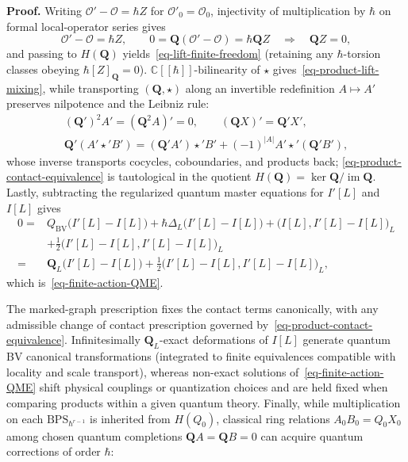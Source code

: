 \documentclass[11pt]{article}
\numberwithin{equation}{section}
\numberwithin{figure}{section}
\numberwithin{table}{section}
\begin{document}
\begin{proofbox}
\textbf{Proof.} Writing $\mathcal O'-\mathcal O=\hbar Z$ for $\mathcal O'_0=\mathcal O_0$, injectivity of multiplication by $\hbar$ on formal local-operator series gives
\begin{equation}\label{eq-mixing-closed}
\mathcal O'-\mathcal O=\hbar Z,\qquad
0=\mathbf Q(\mathcal O'-\mathcal O)=\hbar\mathbf QZ
\quad\Longrightarrow\quad \mathbf QZ=0,
\end{equation}
and passing to $H(\mathbf Q)$ yields~\eqref{eq-lift-finite-freedom} (retaining any $\hbar$-torsion classes obeying $\hbar[Z]_{\mathbf Q}=0$). $\mathbb C[[\hbar]]$-bilinearity of $\star$ gives~\eqref{eq-product-lift-mixing}, while transporting $(\mathbf Q,\star)$ along an invertible redefinition $A\mapsto A'$ preserves nilpotence and the Leibniz rule:
\begin{equation}\label{ch9-redefinition-proof}
\begin{gathered}
(\mathbf Q')^2A'=(\mathbf Q^2A)'=0,\qquad
(\mathbf QX)'=\mathbf Q'X',\\
\mathbf Q'(A'\star' B')
=(\mathbf Q'A')\star' B'+(-1)^{|A|}A'\star'(\mathbf Q'B'),
\end{gathered}
\end{equation}
whose inverse transports cocycles, coboundaries, and products back; \eqref{eq-product-contact-equivalence} is tautological in the quotient $H(\mathbf Q)=\ker\mathbf Q/\operatorname{im}\mathbf Q$. Lastly, subtracting the regularized quantum master equations for $I'[L]$ and $I[L]$ gives
\begin{equation}\label{ch9-action-proof}
\begin{aligned}
0={}&Q_{\mathrm{BV}}\bigl(I'[L]-I[L]\bigr)
+\hbar\Delta_L\bigl(I'[L]-I[L]\bigr)
+\bigl(I[L],I'[L]-I[L]\bigr)_L\\
&+\frac12\bigl(I'[L]-I[L],I'[L]-I[L]\bigr)_L\\
={}&\mathbf Q_L\bigl(I'[L]-I[L]\bigr)
+\frac12\bigl(I'[L]-I[L],I'[L]-I[L]\bigr)_L,
\end{aligned}
\end{equation}
which is~\eqref{eq-finite-action-QME}.~\hfill\qedsymbol
\end{proofbox}
The marked-graph prescription fixes the contact terms canonically, with any admissible change of contact prescription governed by~\eqref{eq-product-contact-equivalence}. Infinitesimally $\mathbf Q_L$-exact deformations of $I[L]$ generate quantum BV canonical transformations (integrated to finite equivalences compatible with locality and scale transport), whereas non-exact solutions of~\eqref{eq-finite-action-QME} shift physical couplings or quantization choices and are held fixed when comparing products within a given quantum theory. Finally, while multiplication on each $\mathrm{BPS}_{\hbar^{r-1}}$ is inherited from $H(Q_0)$, classical ring relations $A_0B_0=Q_0X_0$ among chosen quantum completions $\mathbf QA=\mathbf QB=0$ can acquire quantum corrections of order $\hbar$:
\end{document}
